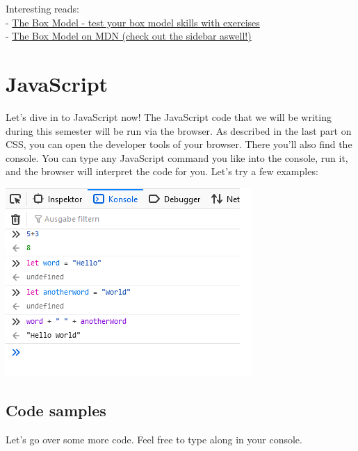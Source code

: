 \documentclass[
]{book}
\begin{document}
Interesting reads:\\
- \href{https://www.w3schools.com/css/css_boxmodel.asp}{The Box Model - test your box model skills with exercises}\\
- \href{https://developer.mozilla.org/en-US/docs/Learn/CSS/Building_blocks/The_box_model}{The Box Model on MDN (check out the sidebar aswell!)}

\hypertarget{javascript}{%
\section{JavaScript}\label{javascript}}

Let's dive in to JavaScript now! The JavaScript code that we will be writing during this semester will be run via the browser. As described in the last part on CSS, you can open the developer tools of your browser. There you'll also find the console. You can type any JavaScript command you like into the console, run it, and the browser will interpret the code for you. Let's try a few examples:

\includegraphics{docs/assets/console.png}

\hypertarget{code-samples}{%
\subsection*{Code samples}\label{code-samples}}

Let's go over some more code. Feel free to type along in your console.
\end{document}
